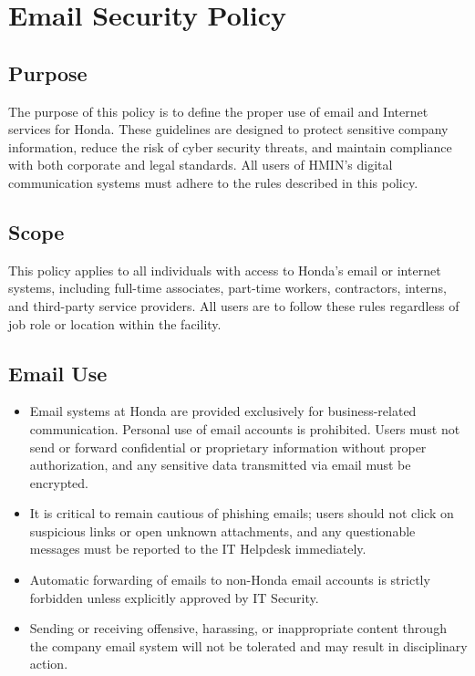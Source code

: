 \chapter{Email Security Policy}
\pagestyle{fancy}

\fancyhf{}

\fancyfoot[C]{\thepage}

\renewcommand{\headrulewidth}{0pt}
\renewcommand{\footrulewidth}{0pt}

\section{Purpose}

The purpose of this policy is to define the proper use of email and Internet services for Honda. These guidelines are designed to protect sensitive company information, reduce the risk of cyber security threats, and maintain compliance with both corporate and legal standards. All users of HMIN’s digital communication systems must adhere to the rules described in this policy.

\section{Scope}

This policy applies to all individuals with access to Honda's email or internet systems, including full-time associates, part-time workers, contractors, interns, and third-party service providers. All users are to follow these rules regardless of job role or location within the facility.

\section{Email Use}

\begin{itemize}
    \item \textbf{}Email systems at Honda are provided exclusively for business-related communication. Personal use of email accounts is prohibited. Users must not send or forward confidential or proprietary information without proper authorization, and any sensitive data transmitted via email must be encrypted.

    \item \textbf{}It is critical to remain cautious of phishing emails; users should not click on suspicious links or open unknown attachments, and any questionable messages must be reported to the IT Helpdesk immediately.

    \item \textbf{}Automatic forwarding of emails to non-Honda email accounts is strictly forbidden unless explicitly approved by IT Security.

    \item \textbf{}Sending or receiving offensive, harassing, or inappropriate content through the company email system will not be tolerated and may result in disciplinary action.
\end{itemize} \textbf{}

